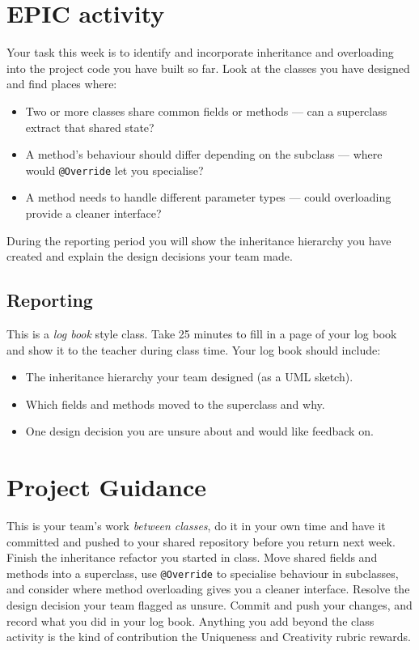 \documentclass[twoside=false,DIV=14]{scrartcl}
\begin{document}
\section*{EPIC activity}

Your task this week is to identify and incorporate inheritance and overloading into the project code you have built so far.  Look at the classes you have designed and find places where:

\begin{itemize}
\itemsep0em
\item Two or more classes share common fields or methods --- can a superclass extract that shared state?
\item A method's behaviour should differ depending on the subclass --- where would \texttt{@Override} let you specialise?
\item A method needs to handle different parameter types --- could overloading provide a cleaner interface?
\end{itemize}

During the reporting period you will show the inheritance hierarchy you have created and explain the design decisions your team made.

\subsection*{Reporting}

This is a \emph{log book} style class.  Take 25 minutes to fill in a page of your log book and show it to the teacher during class time.  Your log book should include:
\begin{itemize}
\itemsep0em
\item The inheritance hierarchy your team designed (as a UML sketch).
\item Which fields and methods moved to the superclass and why.
\item One design decision you are unsure about and would like feedback on.
\end{itemize}

\section*{Project Guidance}

This is your team's work \emph{between classes}, do it in your own time and have it committed and pushed to your shared repository before you return next week.  Finish the inheritance refactor you started in class.  Move shared fields and methods into a superclass, use \texttt{@Override} to specialise behaviour in subclasses, and consider where method overloading gives you a cleaner interface.  Resolve the design decision your team flagged as unsure.  Commit and push your changes, and record what you did in your log book.  Anything you add beyond the class activity is the kind of contribution the Uniqueness and Creativity rubric rewards.
\end{document}
